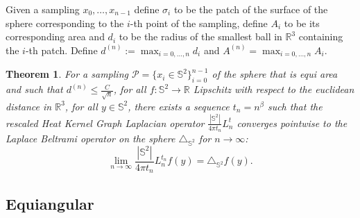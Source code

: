 \documentclass{article} %
\newtheorem{theorem}{Theorem}[section]
\begin{document}
Given a sampling $x_0, \dots, x_{n-1}$ define $\sigma_i$ to be the patch of the surface of the sphere corresponding to the $i$-th point of the sampling, define $A_i$ to be its corresponding area and $d_i$ to be the radius of the smallest ball in $\mathbb R^3$ containing the $i$-th patch. Define $d^{(n)} := \max_{i=0, \dots, n}d_i$ and $A^{(n)}=\max_{i=0, \dots, n}A_i$.

\begin{theorem}
	For a sampling $\mathcal P = \{x_i\in\mathbb S^2\}_{i=0}^{n-1}$ of the sphere that is equi area and such that $d^{(n)} \leq \frac{C}{\sqrt{n}}$, for all $f: \mathbb S^2 \rightarrow \mathbb R$ Lipschitz with respect to the euclidean distance in $\mathbb R^3$, for all $y\in\mathbb S^2$, there exists a sequence $t_n = n^\beta$ such that the rescaled Heat Kernel Graph Laplacian operator $\frac{|\mathbb S^2|}{4\pi t_n}L^t_n$ converges pointwise to the Laplace Beltrami operator on the sphere $\triangle_{\mathbb S^2}$  for $n\to\infty$:
	$$ \lim_{n\to\infty}\frac{|\mathbb S^2|}{4\pi t_n} L_n^{t_n}f(y) =  \triangle_{\mathbb S^2}f(y).$$
	\label{theo:pointwise convergence in the healpix case}
\end{theorem}

\subsection{Equiangular}
\end{document}
